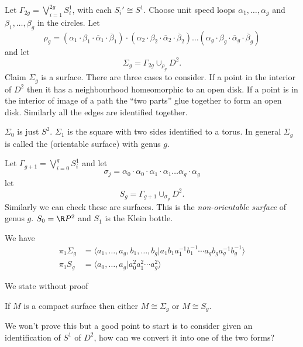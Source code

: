 \documentclass[a4paper]{article}
\begin{document}
\begin{eg}
  Let \(\Gamma_{2g} = \bigvee_{i = 1}^{2g} S_i^1\), with each \(S_i' \cong S^1\). Choose unit speed loops \(\alpha_1, \dots, \alpha_g\) and \(\beta_1, \dots, \beta_g\) in the circles. Let
  \[
    \rho_g = (\alpha_1 \cdot \beta_1 \cdot \overline \alpha_1 \cdot \overline \beta_1) \cdot (\alpha_2 \cdot \beta_2 \cdot \overline \alpha_2 \cdot \overline \beta_2) \dots (\alpha_g \cdot \beta_g \cdot \overline \alpha_g \cdot \overline \beta_g)
  \]
  and let
  \[
    \Sigma_g = \Gamma_{2g} \cup_{\rho_g} D^2.
  \]
  Claim \(\Sigma_g\) is a surface. There are three cases to consider. If a point in the interior of \(D^2\) then it has a neighbourhood homeomorphic to an open disk. If a point is in the interior of image of a path the ``two parts'' glue together to form an open disk. Similarly all the edges are identified together.

  \(\Sigma_0\) is just \(S^2\). \(\Sigma_1\) is the square with two sides identified to a torus. In general \(\Sigma_g\) is called the (orientable surface) with genus \(g\).
\end{eg}

\begin{eg}
  Let \(\Gamma_{g + 1} = \bigvee_{i = 0}^g S_i^1\) and let
  \[
    \sigma_j = \alpha_0 \cdot \alpha_0 \cdot \alpha_1 \cdot \alpha_1 \dots \alpha_g \cdot \alpha_g
  \]
  let
  \[
    S_g = \Gamma_{g + 1} \cup_{\sigma_g} D^2.
  \]
  Similarly we can check these are surfaces. This is the \emph{non-orientable surface} of genus \(g\). \(S_0 = \R P^2\) and \(S_1\) is the Klein bottle.

  We have
  \begin{align*}
    \pi_1 \Sigma_g &= \langle a_1, \dots, a_g, b_1, \dots, b_g | a_1b_1a_1^{-1}b_1^{-1} \cdots a_gb_ga_g^{-1}b_g^{-1}\rangle \\
    \pi_1 S_g &= \langle a_0, \dots, a_g | a_0^2 a_1^2 \cdots a_g^2 \rangle
  \end{align*}
\end{eg}

We state without proof

\begin{theorem}
  If \(M\) is a compact surface then either \(M \cong \Sigma_g\) or \(M \cong S_g\).
\end{theorem}

We won't prove this but a good point to start is to consider given an identification of \(S^1\) of \(D^2\), how can we convert it into one of the two forms?
\end{document}
